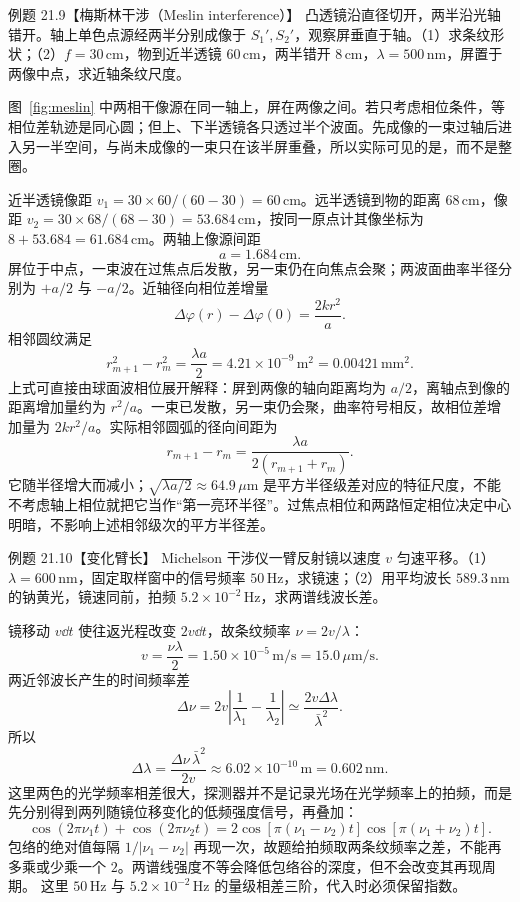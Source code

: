 \begin{origexamplebox}{例题 21.9【梅斯林干涉（Meslin interference）】}
凸透镜沿直径切开，两半沿光轴错开。轴上单色点源经两半分别成像于 $S_1',S_2'$，观察屏垂直于轴。（1）求条纹形状；（2）$f=30\,\mathrm{cm}$，物到近半透镜 $60\,\mathrm{cm}$，两半错开 $8\,\mathrm{cm}$，$\lambda=500\,\mathrm{nm}$，屏置于两像中点，求近轴条纹尺度。
\end{origexamplebox}
\begin{xesolution}
\MeslinSourceDiagram
图~\ref{fig:meslin} 中两相干像源在同一轴上，屏在两像之间。若只考虑相位条件，等相位差轨迹是同心圆；但上、下半透镜各只透过半个波面。先成像的一束过轴后进入另一半空间，与尚未成像的一束只在该半屏重叠，所以实际可见的是，而不是整圈。

近半透镜像距 $v_1=30\times60/(60-30)=60\,\mathrm{cm}$。远半透镜到物的距离 $68\,\mathrm{cm}$，像距 $v_2=30\times68/(68-30)=53.684\,\mathrm{cm}$，按同一原点计其像坐标为 $8+53.684=61.684\,\mathrm{cm}$。两轴上像源间距
\[
 a=1.684\,\mathrm{cm}.
\]
屏位于中点，一束波在过焦点后发散，另一束仍在向焦点会聚；两波面曲率半径分别为 $+a/2$ 与 $-a/2$。近轴径向相位差增量
\[
 \Delta\varphi(r)-\Delta\varphi(0)=\frac{2kr^2}{a}.
\]
相邻圆纹满足
\[
 \boxed{r_{m+1}^2-r_m^2=\frac{\lambda a}{2}
 =4.21\times10^{-9}\,\mathrm{m^2}=0.00421\,\mathrm{mm^2}}.
\]
上式可直接由球面波相位展开解释：屏到两像的轴向距离均为 $a/2$，离轴点到像的距离增加量约为 $r^2/a$。一束已发散，另一束仍会聚，曲率符号相反，故相位差增加量为 $2kr^2/a$。实际相邻圆弧的径向间距为
\[
 \boxed{r_{m+1}-r_m=\frac{\lambda a}{2(r_{m+1}+r_m)}}.
\]
它随半径增大而减小；$\sqrt{\lambda a/2}\approx64.9\,\mu\mathrm m$ 是平方半径级差对应的特征尺度，不能不考虑轴上相位就把它当作“第一亮环半径”。过焦点相位和两路恒定相位决定中心明暗，不影响上述相邻级次的平方半径差。
\end{xesolution}

\begin{origexamplebox}{例题 21.10【变化臂长】}
Michelson 干涉仪一臂反射镜以速度 $v$ 匀速平移。（1）$\lambda=600\,\mathrm{nm}$，固定取样窗中的信号频率 $50\,\mathrm{Hz}$，求镜速；（2）用平均波长 $589.3\,\mathrm{nm}$ 的钠黄光，镜速同前，拍频 $5.2\times10^{-2}\,\mathrm{Hz}$，求两谱线波长差。
\end{origexamplebox}
\begin{xesolution}
镜移动 $v\dd t$ 使往返光程改变 $2v\dd t$，故条纹频率 $\nu=2v/\lambda$：
\[
 \boxed{v=\frac{\nu\lambda}{2}=1.50\times10^{-5}\,\mathrm{m/s}=15.0\,\mu\mathrm{m/s}}.
\]
两近邻波长产生的时间频率差
\[
 \Delta\nu=2v\left|\frac1{\lambda_1}-\frac1{\lambda_2}\right|
 \simeq\frac{2v\Delta\lambda}{\bar\lambda^2}.
\]
所以
\[
 \boxed{\Delta\lambda=\frac{\Delta\nu\,\bar\lambda^2}{2v}
 \approx6.02\times10^{-10}\,\mathrm m=0.602\,\mathrm{nm}}.
\]
这里两色的光学频率相差很大，探测器并不是记录光场在光学频率上的拍频，而是先分别得到两列随镜位移变化的低频强度信号，再叠加：
\[
 \cos(2\pi\nu_1t)+\cos(2\pi\nu_2t)
 =2\cos[\pi(\nu_1-\nu_2)t]\cos[\pi(\nu_1+\nu_2)t].
\]
包络的绝对值每隔 $1/|\nu_1-\nu_2|$ 再现一次，故题给拍频取两条纹频率之差，不能再多乘或少乘一个 $2$。两谱线强度不等会降低包络谷的深度，但不会改变其再现周期。
这里 $50\,\mathrm{Hz}$ 与 $5.2\times10^{-2}\,\mathrm{Hz}$ 的量级相差三阶，代入时必须保留指数。
\end{xesolution}

